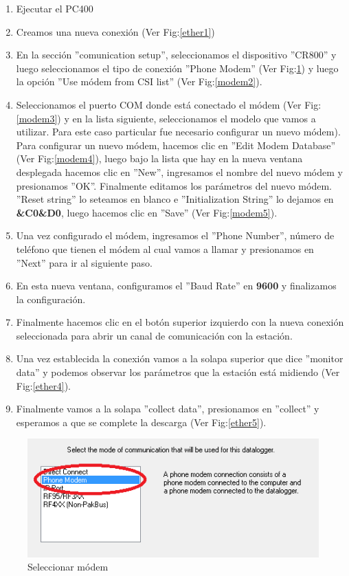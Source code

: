 \begin{enumerate}
\item Ejecutar el PC400
\item Creamos una nueva conexión (Ver Fig:\ref{ether1})
\item En la sección ''comunication setup'', seleccionamos el dispositivo ''CR800'' y luego seleccionamos el tipo de conexión ''Phone Modem'' (Ver Fig:\ref{modem1}) y luego la opción ''Use módem from CSI list'' (Ver Fig:\ref{modem2}).
\item Seleccionamos el puerto COM donde está conectado el módem (Ver Fig:\ref{modem3}) y en la lista siguiente, seleccionamos el modelo que vamos a utilizar. Para este caso particular fue necesario configurar un nuevo módem).
\subitem Para configurar un nuevo módem, hacemos clic en ''Edit Modem Database'' (Ver Fig:\ref{modem4}), luego bajo la lista que hay en la nueva ventana desplegada hacemos clic en ''New'', ingresamos el nombre del nuevo módem y presionamos ''OK''.
\subitem Finalmente editamos los parámetros del nuevo módem. ''Reset string'' lo seteamos en blanco e ''Initialization String'' lo dejamos en \textbf{\&C0\&D0}, luego hacemos clic en ''Save'' (Ver Fig:\ref{modem5}). 
\item Una vez configurado el módem, ingresamos el ''Phone Number'', número de teléfono que tienen el módem al cual vamos a llamar y presionamos en ''Next'' para ir al siguiente paso.
\item En esta nueva ventana, configuramos el ''Baud Rate'' en \textbf{9600} y finalizamos la configuración.
\item Finalmente hacemos clic en el botón superior izquierdo con la nueva conexión seleccionada para abrir un canal de comunicación con la estación.
\item Una vez establecida la conexión vamos a la solapa superior que dice ''monitor data'' y podemos observar los parámetros que la estación está midiendo (Ver Fig:\ref{ether4}).
\item Finalmente vamos a la solapa ''collect data'', presionamos en ''collect'' y esperamos a que se complete la descarga (Ver Fig:\ref{ether5}).
\end{enumerate}
\begin{figure}[h!]
        \centering
        \includegraphics[width=320pt]{images/modem1}
        \caption{Seleccionar módem}
        \label{modem1}
\end{figure}
